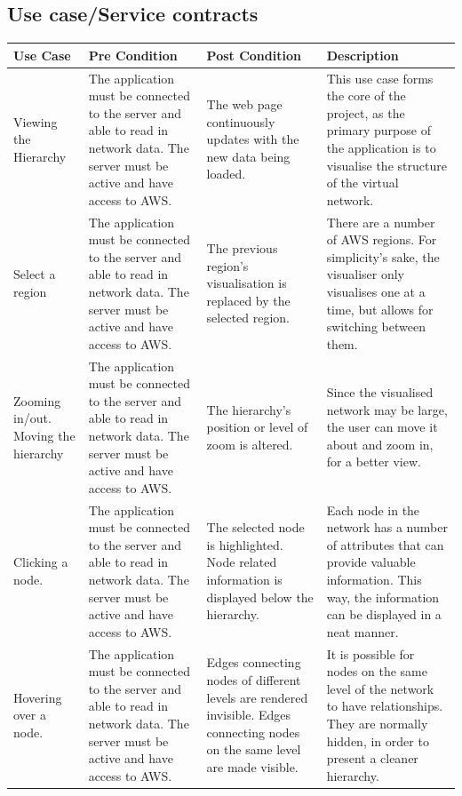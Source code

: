 \documentclass[hidelinks,a4paper,12pt]{article}
\begin{document}
		\subsection{Use case/Service contracts}
		\begin{tabular}{ | p{3cm} | p{4cm} | p{4cm} | p{4cm} |}
			\hline
			Use Case & Pre Condition & Post Condition & Description \\ \hline
			
			Viewing the Hierarchy & The application must be connected to the server and able to read in network data. The server must be active and have access to AWS.& The web page continuously updates with the new data being loaded. & This use case forms the core of the project, as the primary purpose of the application is to visualise the structure of the virtual network.\\ \hline
			
			Select a region 	& The application must be connected to the server and able to read in network data. The server must be active and have access to AWS.& The previous region's visualisation is replaced by the selected region. & There are a number of AWS regions. For simplicity's sake, the visualiser only visualises one at a time, but allows for switching between them.\\ \hline
			
			Zooming in/out. Moving the hierarchy	& The application must be connected to the server and able to read in network data. The server must be active and have access to AWS.& The hierarchy's position or level of zoom is altered. & Since the visualised network may be large, the user can move it about and zoom in, for a better view.\\ \hline
			
			Clicking a node.& The application must be connected to the server and able to read in network data. The server must be active and have access to AWS.& The selected node is highlighted. Node related information is displayed below the hierarchy. & Each node in the network has a number of attributes that can provide valuable information. This way, the information can be displayed in a neat manner.\\ \hline
			
			Hovering over a node.& The application must be connected to the server and able to read in network data. The server must be active and have access to AWS.& Edges connecting nodes of different levels are rendered invisible. Edges connecting nodes on the same level are made visible. & It is possible for nodes on the same level of the network to have relationships. They are normally hidden, in order to present a cleaner hierarchy. \\ \hline
		\end{tabular}
\newpage		
\end{document}
